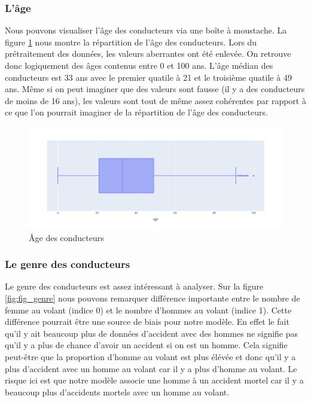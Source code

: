 \documentclass[]{article}
\begin{document}
    \subsubsection{L'âge}
    Nous pouvons visualiser l'âge des conducteurs via une boîte à moustache. La figure \ref{fig:fig_age} nous 
    montre la répartition de l'âge des conducteurs. Lors du prétraitement des données, les valeurs aberrantes 
    ont été enlevée. On retrouve donc logiquement des âges contenus entre 0 et 100 ans. L'âge médian des 
    conducteurs est 33 ans avec le premier quatile à 21 et le troisième quatile à 49 ans. Même si on peut 
    imaginer que des valeurs sont fausse (il y a des conducteurs de moins de 16 ans), les valeurs sont tout de 
    même assez cohérentes par rapport à ce que l'on pourrait imaginer de la répartition de l'âge des conducteurs.

    \begin{figure}[ht]
        \centering
        \includegraphics[width=12cm]{./img/age.png}
        \caption{Âge des conducteurs}
        \label{fig:fig_age}
    \end{figure}

    \subsubsection{Le genre des conducteurs}
    Le genre des conducteurs est assez intéressant à analyser. Sur la figure \ref{fig:fig_genre} nous pouvons 
    remarquer différence importante entre le nombre de femme au volant (indice 0) et le nombre d'hommes au volant 
    (indice 1). Cette différence pourrait être une source de biais pour notre modèle. En effet le fait qu'il y ait 
    beaucoup plus de données d'accident avec des hommes ne signifie pas qu'il y a plus de chance d'avoir un accident 
    si on est un homme. Cela signifie peut-être que la proportion d'homme au volant est plus élévée et donc qu'il 
    y a plus d'accident avec un homme au volant car il y a plus d'homme au volant. Le risque ici est que notre 
    modèle associe une homme à un accident mortel car il y a beaucoup plus d'accidents mortels avec un homme au 
    volant.
\end{document}
